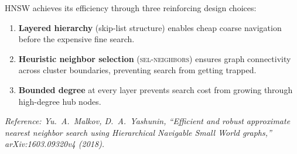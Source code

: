 \documentclass[11pt]{article}
\theoremstyle{definition}
\begin{document}
HNSW achieves its efficiency through three reinforcing design choices:
\begin{enumerate}
  \item \textbf{Layered hierarchy} (skip-list structure) enables cheap coarse navigation before the expensive fine search.
  \item \textbf{Heuristic neighbor selection} (\textsc{sel-neighbors}) ensures graph connectivity across cluster boundaries, preventing search from getting trapped.
  \item \textbf{Bounded degree} at every layer prevents search cost from growing through high-degree hub nodes.
\end{enumerate}

\bigskip
\noindent\textit{Reference: Yu.~A.~Malkov, D.~A.~Yashunin, ``Efficient and robust approximate nearest neighbor search using Hierarchical Navigable Small World graphs,'' arXiv:1603.09320v4 (2018).}
\end{document}
